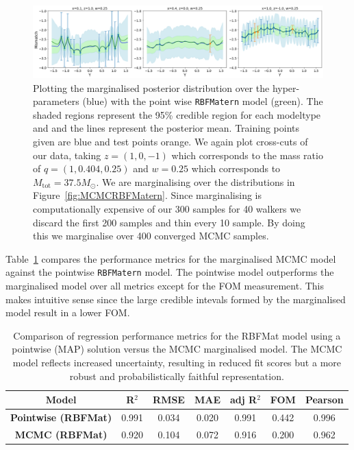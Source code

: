 \documentclass{ucdgradtaughtthesis}
\begin{document}
\begin{figure}[H]
    \centering
    \includegraphics[width=1\textwidth]{LatexPlots/final_gps_plots/MCMCpointwisecomparison_all.png}
    \caption[Comparing the pointwise  model with an alternative marginalised over its hyper-parmeters.]{Plotting the marginalised posterior distribution over the hyper-parameters (blue) with the point wise \texttt{RBFMatern} model (green). The shaded regions represent the 95\% credible region
    for each modeltype and and the lines represent the posterior mean. Training points given are blue and test points orange. We again plot cross-cuts of our data, taking \(z = (1,0,-1)\) which corresponds to the mass ratio of \(q = (1,0.404,0.25)\) and \(w = 0.25\) which corresponds to \(M_{\text{tot}} = 37.5M_\odot\). We are marginalising over the distributions in Figure~\ref{fig:MCMCRBFMatern}. 
    Since marginalising is computationally expensive of our 300 samples for 40 walkers we discard the first 200 samples and thin every 10 sample. By doing this we marginalise over 400 converged MCMC samples.}
    \label{fig:MCMCvsmarginalised}
\end{figure}
%
Table~\ref{tab:pointwise_vs_mcmc} compares the performance metrics for the marginalised MCMC model against the pointwise \texttt{RBFMatern} model.
The pointwise model outperforms the marginalised model over all metrics except for the FOM measurement. This makes intuitive sense since the large credible intevals
formed by the marginalised model result in a lower FOM. 
% 
\begin{table}[H]
    \centering
    \small
    \renewcommand{\arraystretch}{1.3}
    \begin{tabular}{|c|c|c|c|c|c|c|}
    \hline
    \textbf{Model} & \textbf{R$^2$} & \textbf{RMSE} & \textbf{MAE} & \textbf{adj R$^2$} & \textbf{FOM} & \textbf{Pearson} \\
    \hline
    \textbf{Pointwise (RBFMat)} & 0.991 & 0.034 & 0.020 & 0.991 & 0.442 & 0.996 \\
    \textbf{MCMC (RBFMat)}      & 0.920 & 0.104 & 0.072 & 0.916 & 0.200 & 0.962 \\
    \hline
    \end{tabular}
    \caption[Comparing metrics between the pointwise \texttt{RBFMatern} model and its equivalent model marginalised over the hyper-parameters.]{Comparison of regression performance metrics for the RBFMat model using a pointwise (MAP) solution versus the MCMC marginalised model. The MCMC model reflects increased uncertainty, resulting in reduced fit scores but a more robust and probabilistically faithful representation.}
    \label{tab:pointwise_vs_mcmc}
\end{table}
%
\end{document}
